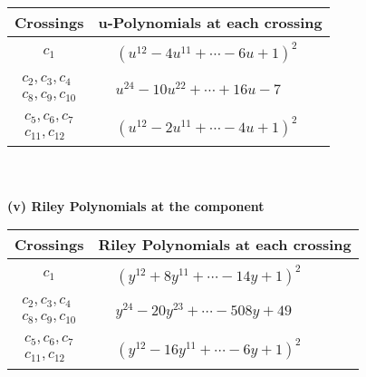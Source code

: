 \documentclass[1p]{elsarticle_modified}
\theoremstyle{definition}
\begin{document}
\begin{tabular}{m{50pt}|m{274pt}}
Crossings & \hspace{64pt}u-Polynomials at each crossing \\
\hline $$\begin{aligned}c_{1}\end{aligned}$$&$\begin{aligned}
&(u^{12}-4 u^{11}+\cdots-6 u+1)^{2}
\end{aligned}$\\
\hline $$\begin{aligned}c_{2},c_{3},c_{4}\\c_{8},c_{9},c_{10}\end{aligned}$$&$\begin{aligned}
&u^{24}-10 u^{22}+\cdots+16 u-7
\end{aligned}$\\
\hline $$\begin{aligned}c_{5},c_{6},c_{7}\\c_{11},c_{12}\end{aligned}$$&$\begin{aligned}
&(u^{12}-2 u^{11}+\cdots-4 u+1)^{2}
\end{aligned}$\\
\hline
\end{tabular}\\~\\
\newpage\renewcommand{\arraystretch}{1}
\flushleft \textbf{(v) Riley Polynomials at the component}\newline \\
\begin{tabular}{m{50pt}|m{274pt}}
Crossings & \hspace{64pt}Riley Polynomials at each crossing \\
\hline $$\begin{aligned}c_{1}\end{aligned}$$&$\begin{aligned}
&(y^{12}+8 y^{11}+\cdots-14 y+1)^{2}
\end{aligned}$\\
\hline $$\begin{aligned}c_{2},c_{3},c_{4}\\c_{8},c_{9},c_{10}\end{aligned}$$&$\begin{aligned}
&y^{24}-20 y^{23}+\cdots-508 y+49
\end{aligned}$\\
\hline $$\begin{aligned}c_{5},c_{6},c_{7}\\c_{11},c_{12}\end{aligned}$$&$\begin{aligned}
&(y^{12}-16 y^{11}+\cdots-6 y+1)^{2}
\end{aligned}$\\
\hline
\end{tabular}\\~\\
\end{document}

